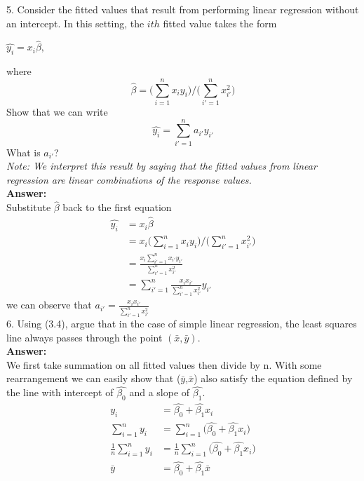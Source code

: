 \documentclass[12pt]{article}
\begin{document}
5. Consider the fitted values that result from performing linear regression without an intercept. In this setting, the $ith$ fitted value takes the form
\begin{center}
$\hat{y_i}=x_i \hat{\beta},$
\end{center}
where
$$\hat{\beta}=\Big(\sum_{i=1}^n {x_i y_i} \Big)/ \Big(\sum_{i'=1}^n {x_{i'}^2} \Big) $$
Show that we can write 
$$\hat{y_i}=\sum_{i'=1}^n{a_{i'}y_{i'}} $$
What is $a_{i'}$?\\
\textit{Note: We interpret this result by saying that the fitted values from linear regression are linear combinations of the response values.}\\
\textbf{Answer:}\\
Substitute $\hat{\beta}$ back to the first equation
\begin{align*} 
\hat{y_i}&=x_i\hat{\beta}\\
&=x_i\Big(\sum_{i=1}^n {x_i y_i} \Big)/ \Big(\sum_{i'=1}^n {x_{i'}^2} \Big)\\
&=\frac{x_i\sum_{i'=1}^n {x_{i'} y_{i'}} }{\sum_{i'=1}^n {x_{i'}^2}}\\
&=\sum_{i'=1}^n {\frac{x_i x_{i'}}{\sum_{i'=1}^n {x_{i'}^2} }} y_{i'}
\end{align*}
we can observe that $a_{i'}=\frac{x_i x_{i'}}{\sum_{i'=1}^n {x_{i'}^2} }$\\

6. Using (3.4), argue that in the case of simple linear regression, the least squares line always passes through the point $(\bar{x},\bar{y})$.\\
\textbf{Answer:}\\
We first take summation on all fitted values then divide by n. With some rearrangement we can easily show that ($\bar{y}$,$\bar{x}$) also satisfy the equation defined by the line with intercept of $\hat{\beta_0}$ and a slope of $\hat{\beta_1}$.
\begin{align*}
y_i&=\hat{\beta_0}+\hat{\beta_1}x_i\\
\sum_{i=1}^n y_i&=\sum_{i=1}^n \big(\hat{\beta_0}+\hat{\beta_1}x_i \big)\\
\frac{1}{n} \sum_{i=1}^n y_i &=\frac{1}{n}\sum_{i=1}^n \big(\hat{\beta_0}+\hat{\beta_1}x_i \big)\\
\bar{y}&=\hat{\beta_0}+\hat{\beta_1}\bar{x}
\end{align*}
\end{document}
